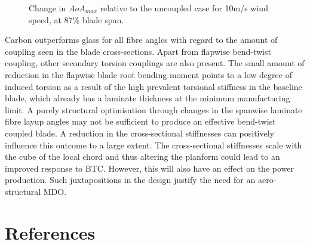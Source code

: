\documentclass[a4paper]{jpconf}
\begin{document}
\begin{figure}[pth]
\begin{minipage}{0.35\textwidth}
\caption{\label{subfig:alphacurve_rel}Change in $AoA_{max}$ relative to the uncoupled case for 10m/s wind speed, at 87\% blade span.}
\end{minipage} 
\end{figure}

 Carbon outperforms glass for all fibre angles with regard to the amount of coupling seen in the blade cross-sections. Apart from flapwise bend-twist coupling, other secondary torsion couplings are also present. The small amount of reduction in the flapwise blade root bending moment points to a low degree of induced torsion as a result of the high prevalent torsional stiffness in the baseline blade, which already has a laminate thickness at the minimum manufacturing limit. A purely structural optimisation through changes in the spanwise laminate fibre layup angles may not be sufficient to produce an effective bend-twist coupled blade. A reduction in the cross-sectional stiffnesses can positively influence this outcome to a large extent. The cross-sectional stiffnesses scale with the cube of the local chord and thus altering the planform could lead to an improved response to BTC. However, this will also have an effect on the power production. Such juxtapositions in the design justify the need for an aero-structural MDO.    

\section*{References}


\end{document}
